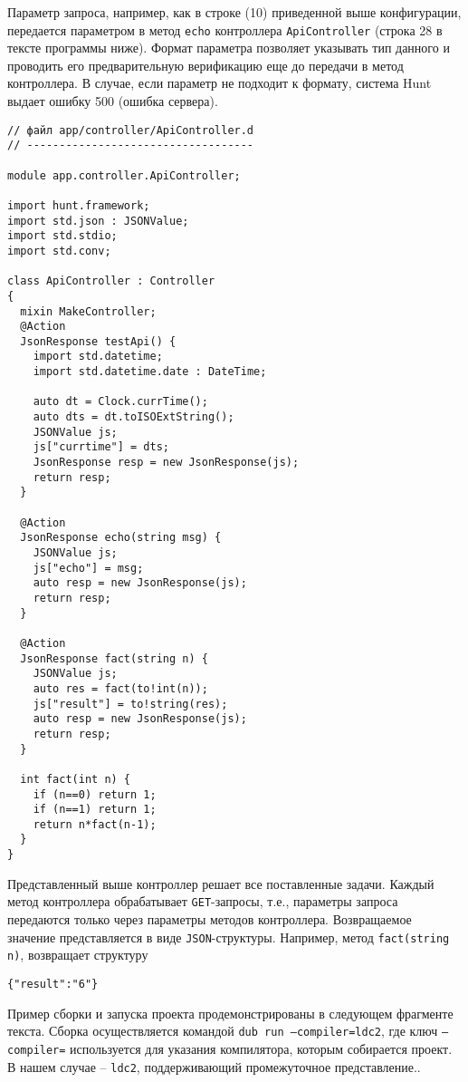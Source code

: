 \documentclass{studrep}
\begin{document}
Параметр запроса, например, как в строке (10) приведенной выше конфигурации, передается параметром в метод \verb|echo| контроллера \verb|ApiController| (строка 28 в тексте программы ниже).  Формат параметра позволяет указывать тип данного и проводить его предварительную верификацию еще до передачи в метод контроллера.  В случае, если параметр не подходит к формату, система Hunt выдает ошибку 500 (ошибка сервера).
\begin{verbatim}
// файл app/controller/ApiController.d
// -----------------------------------

module app.controller.ApiController;

import hunt.framework;
import std.json : JSONValue;
import std.stdio;
import std.conv;

class ApiController : Controller
{
  mixin MakeController;
  @Action
  JsonResponse testApi() {
    import std.datetime;
    import std.datetime.date : DateTime;

    auto dt = Clock.currTime();
    auto dts = dt.toISOExtString();
    JSONValue js;
    js["currtime"] = dts;
    JsonResponse resp = new JsonResponse(js);
    return resp;
  }

  @Action
  JsonResponse echo(string msg) {
    JSONValue js;
    js["echo"] = msg;
    auto resp = new JsonResponse(js);
    return resp;
  }

  @Action
  JsonResponse fact(string n) {
    JSONValue js;
    auto res = fact(to!int(n));
    js["result"] = to!string(res);
    auto resp = new JsonResponse(js);
    return resp;
  }

  int fact(int n) {
    if (n==0) return 1;
    if (n==1) return 1;
    return n*fact(n-1);
  }
}
\end{verbatim}

Представленный выше контроллер решает все поставленные задачи.  Каждый метод контроллера обрабатывает \verb|GET|-запросы, т.е., параметры запроса передаются только через параметры методов контроллера.  Возвращаемое значение представляется в виде \verb|JSON|-структуры.  Например, метод \verb|fact(string n)|, возвращает структуру
\begin{verbatim}
{"result":"6"}
\end{verbatim}

Пример сборки и запуска проекта продемонстрированы в следующем фрагменте текста.  Сборка осуществляется командой \texttt{dub run --compiler=ldc2}, где ключ \texttt{--compiler=} используется для указания компилятора, которым собирается проект.  В нашем случае -- \texttt{ldc2}, поддерживающий промежуточное представление..
\end{document}
